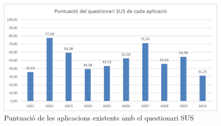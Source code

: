 \begin{figure}[htp]
\centering
\includegraphics[scale=0.8]{Apps_art_state_SUS.png}
\caption{Puntuació de les aplicacions existents amb el questionari SUS}\label{fig:Apps_art_state}
\end{figure}

